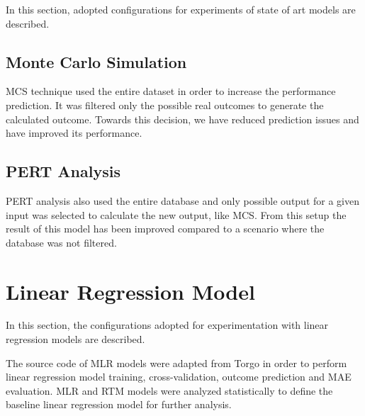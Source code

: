 In this section, adopted configurations for experiments of state of art models are described.

\subsection{Monte Carlo Simulation}

MCS technique used the entire dataset in order to increase the performance prediction. It was filtered only the possible real outcomes to generate the calculated outcome. Towards this decision, we have reduced prediction issues and have improved its performance.

\subsection{PERT Analysis}

PERT analysis also used the entire database and only possible output for a given input was selected to calculate the new output, like MCS. From this setup the result of this model has been improved compared to a scenario where the database was not filtered.

\section{Linear Regression Model}

In this section, the configurations adopted for experimentation with linear regression models are described.

The source code of MLR models were adapted from Torgo \cite{torgo2003data} in order to perform linear regression model training, cross-validation, outcome prediction and MAE evaluation. MLR and RTM models were analyzed statistically to define the baseline linear regression model for further analysis.

